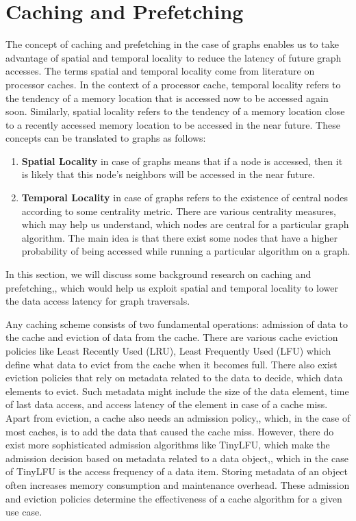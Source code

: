 \section{Caching and Prefetching}\label{sec:cachingDistSys}
The concept of caching and prefetching in the case of graphs enables us to take
advantage of spatial and temporal locality to reduce the latency of future graph
accesses. The terms spatial and temporal locality come from literature on
processor caches. In the context of a processor cache, temporal locality refers
to the tendency of a memory location that is accessed now to be
accessed again soon. Similarly, spatial locality refers to the 
tendency of a memory location close to a recently accessed memory location to be
accessed in the near future. These concepts can be translated to graphs as
follows:
\begin{enumerate}
    \item \textbf{Spatial Locality} in case of graphs means that if a node is
        accessed, then it is likely that this node's neighbors will be accessed
        in the near future.
    \item \textbf{Temporal Locality} in case of graphs refers to the existence
        of central nodes according to some centrality metric. There are
        various centrality measures\cite{klein2010centrality}, which may help us 
        understand, which nodes are central for a particular graph algorithm. The
        main idea is that there exist some nodes that have a higher probability
        of being accessed while running a particular algorithm on a graph.
\end{enumerate}
In this section, we will discuss some background research on caching and
prefetching,, which would help us exploit  spatial and temporal locality to lower
the data access latency for graph traversals.

\medskip
Any caching scheme consists of two fundamental operations: admission of
data to the cache and eviction of data from the cache. There are various cache
eviction policies like Least Recently Used (LRU), Least Frequently Used (LFU)
which define what data to evict from the cache when it becomes
full. There also exist eviction policies that rely on metadata related to the
data to decide, which data elements to evict. Such metadata might
include the size of the data element, time of last data access, and access latency
of the element in case of a cache miss. Apart from eviction, a cache also needs
an admission policy,, which, in the case of most caches, is to add the data that
caused the cache miss. However, there do exist more sophisticated
admission algorithms like TinyLFU\cite{einziger2017tinylfu}, which make the
admission decision based on metadata related to a data object,, which in the case of
TinyLFU is the access frequency of a data item. Storing metadata of an
object often increases memory consumption and maintenance overhead. These
admission and eviction policies determine the effectiveness of a cache algorithm
for a given use case.

